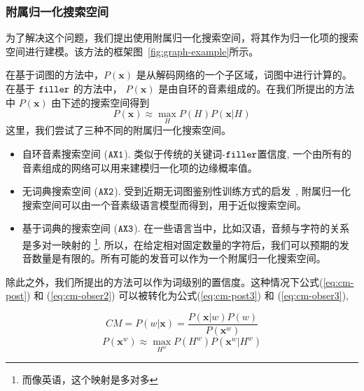  \subsubsection{附属归一化搜索空间}
 \label{Sec:norm-graph-detail}

 为了解决这个问题，我们提出使用附属归一化搜索空间，将其作为归一化项的搜索空间进行建模。该方法的框架图~\ref{fig:graph-example}所示。 

 在基于词图的方法中，$P(\mathbf{x})$ 是从解码网络的一个子区域，词图中进行计算的。在基于 $\tt filler$ 的方法中， $P(\mathbf{x})$ 是由自环的音素组成的。在我们所提出的方法中 $P(\mathbf{x})$ 由下述的搜索空间得到
 \begin{equation}\label{eq:cm-obser2}
 P(\mathbf{x})\approx \max_H P(H)    P(\mathbf{x}|H)
 \end{equation}
 这里，我们尝试了三种不同的附属归一化搜索空间。
 \begin{itemize}
     \item 自环音素搜索空间 ($\tt AX1$). 类似于传统的关键词-$\tt filler$置信度\cite{young1994detecting},  一个由所有的音素组成的网络可以用来建模归一化项的边缘概率值。

     \item 无词典搜索空间 ($\tt AX2 $). 受到近期无词图鉴别性训练方式的启发~\cite{povey2016purely},  附属归一化搜索空间可以由一个音素级语言模型而得到，用于近似搜索空间。

     \item 基于词典的搜索空间 ($\tt AX3 $). 在一些语言当中，比如汉语，音频与字符的关系是多对一映射的 \footnote{而像英语，这个映射是多对多}. 所以，在给定相对固定数量的字符后，我们可以预期的发音数量是有限的。所有可能的发音可以作为一个附属归一化搜索空间。
 \end{itemize}
 除此之外，我们所提出的方法可以作为词级别的置信度。这种情况下公式(\ref{eq:cm-post}) 和 (\ref{eq:cm-obser2}) 可以被转化为公式(\ref{eq:cm-post3}) 和 (\ref{eq:cm-obser3}),

 \begin{equation}\label{eq:cm-post3}
        CM=P(w|\mathbf{x}) =
         \frac{P(\mathbf{x}|w)  P(w)}{P(\mathbf{x}^{w})}
  \end{equation}
 \begin{equation}\label{eq:cm-obser3}
 P(\mathbf{x}^{w})\approx \max_{H^{w}} P(H^{w})    P(\mathbf{x}^{w}|H^{w})
 \end{equation}
 
